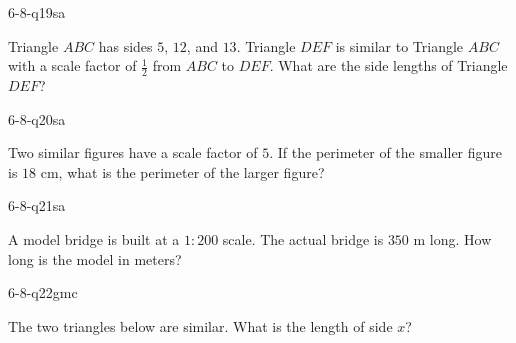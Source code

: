 \begin{practiceQuestion}{6-8-q19}{sa}
\begin{questionText}
Triangle $ABC$ has sides $5$, $12$, and $13$. Triangle $DEF$ is similar to Triangle $ABC$ with a scale factor of $\frac{1}{2}$ from $ABC$ to $DEF$. What are the side lengths of Triangle $DEF$?
\end{questionText}
\end{practiceQuestion}

\begin{practiceQuestion}{6-8-q20}{sa}
\begin{questionText}
Two similar figures have a scale factor of $5$. If the perimeter of the smaller figure is $18$ cm, what is the perimeter of the larger figure?
\end{questionText}
\end{practiceQuestion}

\begin{practiceQuestion}{6-8-q21}{sa}
\begin{questionText}
A model bridge is built at a $1:200$ scale. The actual bridge is $350$ m long. How long is the model in meters?
\end{questionText}
\end{practiceQuestion}


\begin{practiceQuestion}{6-8-q22}{gmc}
\begin{questionText}
The two triangles below are similar. What is the length of side $x$?

\begin{center}
\end{center}
\end{questionText}
\end{practiceQuestion}

